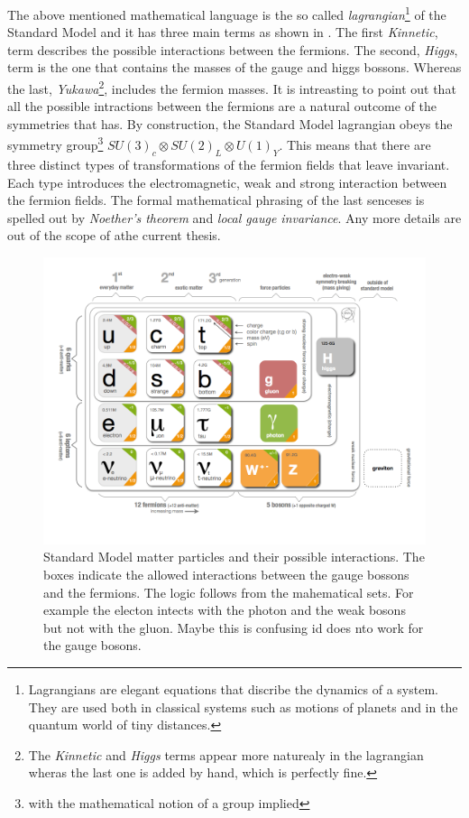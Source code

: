 The above mentioned mathematical language is the so called
{\it lagrangian}\footnote{Lagrangians are elegant equations that discribe the dynamics of a system. They are used both in classical
systems such as motions of planets and in the quantum world of tiny distances.}
of the Standard Model and it has three main terms as shown in . The first {\it Kinnetic}, term describes the possible
interactions between the fermions. The second, {\it Higgs}, term is the one that contains the masses of the gauge and higgs bossons.
Whereas the last,
{\it Yukawa}\footnote{The {\it Kinnetic} and {\it Higgs} terms appear more naturealy in the lagrangian wheras the last one is added by hand, which is perfectly fine.},
includes the fermion masses. It is intreasting to point out that all the possible intractions between the fermions are a natural outcome of the symmetries that
 has. By construction, the Standard Model lagrangian obeys the symmetry group\footnote{with the mathematical notion of a group implied}
$SU(3)_c\otimes SU(2)_L\otimes U(1)_Y$. This means that there are three distinct types of transformations of the fermion fields that leave 
invariant. Each type introduces the electromagnetic, weak and strong interaction between the
fermion fields. The formal mathematical phrasing of the last senceses is spelled out by {\it Noether's theorem} and {\it local gauge invariance}.
Any more details are out of the scope of athe current thesis.

\begin{figure}[h]
  \begin{center}
    \includegraphics[trim=1.4cm 0cm 5.95cm 0cm, clip=true, width=\textwidth]{Figures/Chapter1/Standard_model_infographic.png}
    \caption{Standard Model matter particles and their possible interactions. The boxes indicate the allowed interactions
             between the gauge bossons and the fermions. The logic follows from the mahematical sets. For example the electon
             intects with the photon and the weak bosons but not with the gluon. {\color{red} Maybe this is confusing id does nto work for the gauge bosons.}}
    \label{sm_particles}
  \end{center}
\end{figure}

